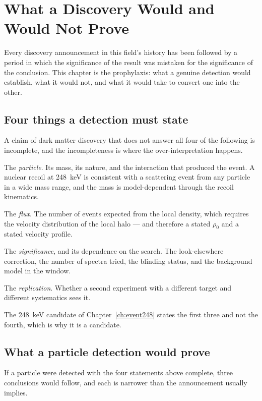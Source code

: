 
\chapter{What a Discovery Would and Would Not Prove}
\label{ch:discovery}

Every discovery announcement in this field's history has been followed by a
period in which the significance of the result was mistaken for the
significance of the conclusion. This chapter is the prophylaxis: what a
genuine detection would establish, what it would not, and what it would take
to convert one into the other.

\section{Four things a detection must state}A claim of dark matter discovery
that does not answer all four of the following is incomplete, and the
incompleteness is where the over-interpretation happens.

The \emph{particle}. Its mass, its nature, and the interaction that
produced the event. A nuclear recoil at 248~keV is consistent with a
scattering event from any particle in a wide mass range, and the mass is
model-dependent through the recoil kinematics.

The \emph{flux}. The number of events expected from the local density,
which requires the velocity distribution of the local halo --- and therefore
a stated $\rho_0$ and a stated velocity profile.

The \emph{significance}, and its dependence on the search. The look-elsewhere
correction, the number of spectra tried, the blinding status, and the
background model in the window.

The \emph{replication}. Whether a second experiment with a different target
and different systematics sees it.

The 248~keV candidate of Chapter~\ref{ch:event248} states the first three
and not the fourth, which is why it is a candidate.

\section{What a particle detection would prove}If a particle were detected with
the four statements above complete, three conclusions would follow, and each
is narrower than the announcement usually implies.

